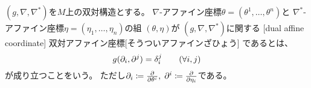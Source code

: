 \documentclass[report]{jlreq}
\begin{document}
\begin{definition}[双対アファイン座標]
    $(g, \nabla, \nabla^*)$を$M$上の双対構造とする。
    $\nabla$-アファイン座標$\theta = (\theta^1, \ldots, \theta^n)$と
    $\nabla^*$-アファイン座標$\eta = (\eta_1, \ldots, \eta_n)$の組
    $(\theta, \eta)$が
    $(g, \nabla, \nabla^*)$に関する
    [dual affine coordinate]
        {双対アファイン座標}[そうついアファインざひょう]
    であるとは、
    \begin{equation}
        g(\partial_i, \partial^j) = \delta_i^j
            \qquad
            (\forall i, j)
    \end{equation}
    が成り立つことをいう。
    ただし$\del_i \coloneqq \deldel{\theta^i}, \;
        \del^i \coloneqq \deldel{\eta_i}$である。
\end{definition}
\end{document}
